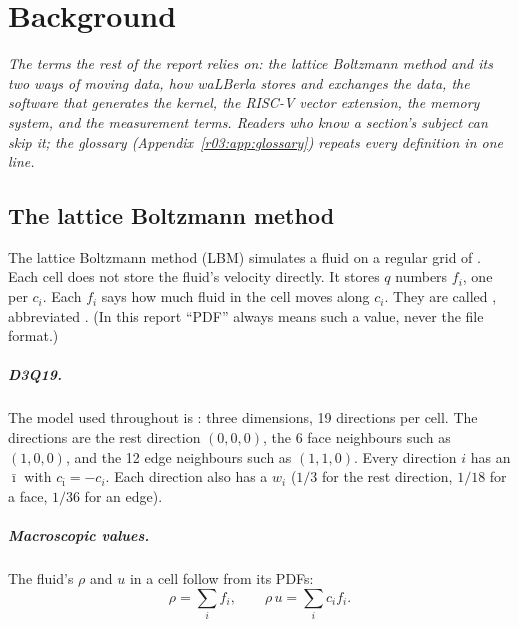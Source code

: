 \chapter{Background}\label{r03:ch:background}

\emph{The terms the rest of the report relies on: the lattice Boltzmann method and its two
ways of moving data, how waLBerla stores and exchanges the data, the software that generates
the kernel, the RISC-V vector extension, the memory system, and the measurement terms. Readers
who know a section's subject can skip it; the glossary (Appendix~\ref{r03:app:glossary}) repeats
every definition in one line.}

\section{The lattice Boltzmann method}\label{r03:sec:bg-lbm}

The lattice Boltzmann method (LBM) simulates a fluid on a regular grid of . Each
cell does not store the fluid's velocity directly. It stores $q$ numbers $f_i$, one per
 $c_i$. Each $f_i$ says how much fluid in the cell moves along
$c_i$. They are called , abbreviated
. (In this report ``PDF'' always means such a value, never the file format.)

\paragraph{D3Q19.} The model used throughout is : three dimensions, 19
directions per cell. The directions are the rest direction $(0,0,0)$, the 6 face
neighbours such as $(1,0,0)$, and the 12 edge neighbours such as $(1,1,0)$. Every direction
$i$ has an  $\bar\imath$ with $c_{\bar\imath} = -c_i$. Each
direction also has a  $w_i$ ($1/3$ for the rest direction, $1/18$ for a face,
$1/36$ for an edge).

\paragraph{Macroscopic values.} The fluid's  $\rho$ and  $u$
in a cell follow from its PDFs:
\[
  \rho = \sum_i f_i, \qquad \rho\,u = \sum_i c_i f_i .
\]

